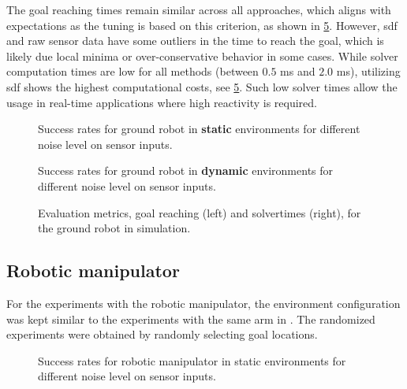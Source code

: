 The goal reaching times remain similar across all approaches, which aligns with
expectations as the tuning is based on this criterion, as shown in
\cref{fig:point_robot_sim_metrics}. However, \ac{sdf} and
raw sensor data have some outliers in the time to reach the
goal, which is likely due local minima or
over-conservative behavior in some cases.
While solver computation times are low
for all methods (between $0.5$ ms and $2.0$ ms), utilizing
\ac{sdf} shows the highest computational costs, see
\cref{fig:point_robot_sim_metrics}. Such low solver
times allow the usage in real-time applications where high
reactivity is required.
%
\begin{figure}[ht]
  \centering
  
  \caption{Success rates for ground robot in \textbf{static}
  environments for different noise level on sensor inputs.
  }%
  \label{fig:point_robot_sim_success_static}
\end{figure}
%
\begin{figure}[ht]
  \centering
  
  \caption{Success rates for ground robot in
  \textbf{dynamic}
  environments for different noise level on sensor inputs.
  }%
  \label{fig:point_robot_sim_success_dynamic}
\end{figure}
%
\begin{figure}[ht]
  \centering
  \begin{subfigure}{0.48\linewidth}
    \centering
    
    \label{subfig:point_robot_sim_time2Goal}
  \end{subfigure}
  \begin{subfigure}{0.48\linewidth}
    \centering
    
    \label{subfig:point_robot_sim_solvertimes}
  \end{subfigure}%
  \caption{Evaluation metrics, goal reaching (left) and
  solvertimes (right), for the ground robot in simulation.
  }%
  \label{fig:point_robot_sim_metrics}
\end{figure}

\subsection{Robotic manipulator}
\label{sub:manipulator}
%
For the experiments with the robotic manipulator, the
environment configuration was kept similar to the
experiments with the same arm in \cite{bhardwaj2022storm}.
The randomized experiments were obtained by randomly
selecting goal locations.
%
\begin{figure}[ht]
  \centering
  
  \caption{Success rates for robotic manipulator in static
  environments for different noise level on sensor inputs.
  }%
  \label{fig:panda_robot_sim_success_static}
\end{figure}
%

